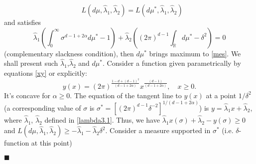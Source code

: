 \documentclass[12pt]{iopart}
\newenvironment{proof}
{\par\noindent{\bf Proof}}
{\hfill$\scriptstyle\blacksquare$}
\begin{document}
\begin{proof}
$${\begin{smallmatrix}
\end{smallmatrix}} L(d\mu,\widehat{\lambda}_1,\widehat{\lambda}_2)=L(d\mu^*,\widehat{\lambda}_1,\widehat{\lambda}_2)$$ and satisfies
$$
\widehat\lambda_1\left(\int_0^\infty\sigma^{d-1+2\alpha}d\mu^*-1\right)+\widehat\lambda_2\left((2\pi)^{d-1}\int_{\mathbb
    R}d\mu^*-\delta^2 \right)=0
$$
 (complementary slackness condition), then $d\mu^*$ brings maximum to \eqref{mes}. 
We shall present such $\widehat\lambda_1$,$\widehat\lambda_2$ and $d\mu^*$.
Consider a function given parametrically by equations \eqref{xy} or explicitly:
 \[
y(x)=(2\pi)^{\frac{1-d+(d-1)^2}{(d-1+2\alpha)}}x^{\frac{(d-1)}{(d-1+2\alpha)}},\quad x\ge 0.
\]
It's concave for $\alpha\geqslant 0$. The equation of the tangent line to $y(x)$ at a point $1/\delta^2$ (a corresponding value of $\sigma$ is $\sigma^*=[(2\pi)^{d-1}\delta^{-2}]^{1/(d-1+2\alpha)}$)
is $y=\widehat\lambda_1x+\widehat\lambda_2$, where
$\widehat\lambda_1$, $\widehat\lambda_2$ defined in
\eqref{lambda3.1}. Thus, we have
$\widehat\lambda_1x(\sigma)+\widehat\lambda_2-y(\sigma)\geqslant 0$ and
$L(d\mu,\widehat\lambda_1,\widehat\lambda_2)\geqslant
-\widehat\lambda_1-\widehat\lambda_2\delta^2.$
Consider a measure supported in $\sigma^*$ (i.e. $\delta$-function at this point)

\end{proof}
\end{document}
